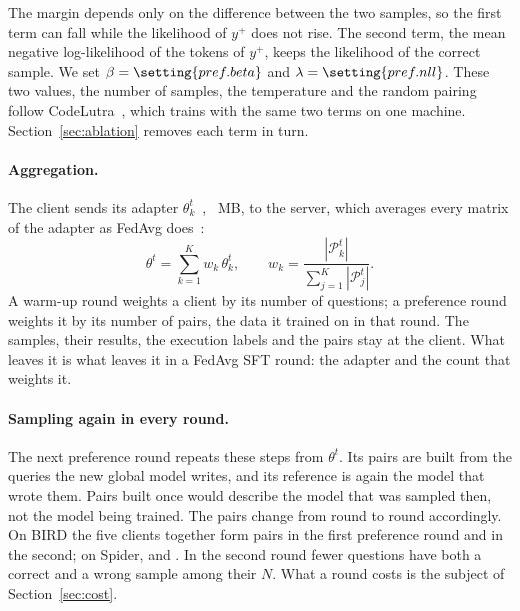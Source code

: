 The margin depends only on the difference between the two samples, so the first term can fall while the likelihood of $y^{+}$ does not rise. The second term, the mean negative log-likelihood of the tokens of $y^{+}$, keeps the likelihood of the correct sample. We set $\beta = \setting{pref.beta}$ and $\lambda = \setting{pref.nll}$. These two values, the number of samples, the temperature and the random pairing follow CodeLutra~\cite{tao2024codelutra}, which trains with the same two terms on one machine. Section~\ref{sec:ablation} removes each term in turn.

\paragraph{Aggregation.}
The client sends its adapter $\theta_k^{t}$~\cite{hu2022lora}, ~MB, to the server, which averages every matrix of the adapter as FedAvg does~\cite{mcmahan2017fedavg}:
\begin{equation}
  \theta^{t} = \sum_{k=1}^{K} w_k \, \theta_k^{t},
  \qquad
  w_k = \frac{|\mathcal{P}_k^{t}|}{\sum_{j=1}^{K} |\mathcal{P}_j^{t}|}.
  \label{eq:agg}
\end{equation}
A warm-up round weights a client by its number of questions; a preference round weights it by its number of pairs, the data it trained on in that round. The samples, their results, the execution labels and the pairs stay at the client. What leaves it is what leaves it in a FedAvg SFT round: the adapter and the count that weights it.

\paragraph{Sampling again in every round.}
The next preference round repeats these steps from $\theta^{t}$. Its pairs are built from the queries the new global model writes, and its reference is again the model that wrote them. Pairs built once would describe the model that was sampled then, not the model being trained. The pairs change from round to round accordingly. On BIRD the five clients together form  pairs in the first preference round and  in the second; on Spider,  and . In the second round fewer questions have both a correct and a wrong sample among their $N$. What a round costs is the subject of Section~\ref{sec:cost}.
